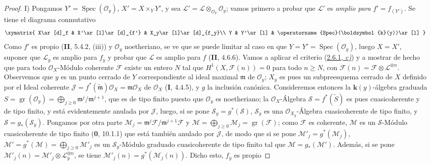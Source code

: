 \documentclass[10pt,oneside,openany]{book}
\theoremstyle{egaenv}\newtheorem*{env}{---}
\theoremstyle{egastatement}
\theoremstyle{egadescription}
\renewcommand{\geq}{\geqslant}
\begin{document}
\begin{proof}
\noindent I) Pongamos
$Y'=\operatorname{Spec}(\mathcal O_y)$, $X'=X\times_YY'$, y sea
$\mathcal L'=\mathcal L\otimes_{\mathcal O_Y}\mathcal O_y$;
vamos primero a probar que $\mathcal L'$ es \emph{amplio para}
$f'=f_{(Y')}$. Se tiene el diagrama conmutativo
\[
\xymatrix{
X\ar[d]_f & X'\ar[l]\ar[d]_{f'} & X_y\ar[l]\ar[d]_{f_y}\\
Y & Y'\ar[l] & \operatorname{Spec}(\boldsymbol{k}(y))\ar[l]
}
\]
Como $f'$ es propio (\textbf{II}, 5.4.2, (iii)) y $\mathcal O_y$ noetheriano, se
ve que se puede limitar al caso en que
$Y=Y'=\operatorname{Spec}(\mathcal O_y)$, luego $X=X'$, suponer que
$\mathcal L_y$ es amplio para $f_y$ y probar que $\mathcal L$ es amplio
para $f$ (\textbf{II}, 4.6.6). Vamos a aplicar el criterio
(\hyperref[III.2.6.1-fr]{2.6.1, \emph{c)}}) y a mostrar de hecho que para todo
$\mathcal O_X$-Módulo coherente $\mathcal F$ existe un entero $N$ tal que
$H^1(X,\mathcal F(n))=0$ para todo $n\geq N$, con
$\mathcal F(n)=\mathcal F\otimes\mathcal L^{\otimes n}$.
Observemos que $y$ es un punto cerrado de $Y$ correspondiente al ideal maximal
$\mathfrak m$ de $\mathcal O_y$; $X_y$ es pues un subpreesquema cerrado de
$X$ definido por el Ideal coherente
$\mathcal J=f^*(\widetilde{\mathfrak m})\mathcal O_X=
\mathfrak m\mathcal O_X$ de $\mathcal O_X$ (\textbf{I}, 4.4.5), y $g$ la inclusión
canónica. Consideremos entonces la $\boldsymbol{k}(y)$-álgebra graduada
$S=\operatorname{gr}(\mathcal O_y)
=\bigoplus_{j\geq0}\mathfrak m^j/\mathfrak m^{j+1}$,
que es de tipo finito puesto que $\mathcal O_y$ es noetheriano; la
$\mathcal O_X$-Álgebra $\mathcal S=f^*(\widetilde S)$ es pues
cuasicoherente y de tipo finito, y está evidentemente anulada por
$\mathcal J$, luego, si se pone $\mathcal S_y=g^*(\mathcal S)$,
$\mathcal S_y$ es una $\mathcal O_{X_y}$-Álgebra cuasicoherente de tipo
finito, y $\mathcal S=g_*(\mathcal S_y)$. Pongamos por otra parte
$\mathcal M_j=\mathfrak m^j\mathcal F/\mathfrak m^{j+1}\mathcal F$ y
$\mathcal M=\bigoplus_{j\geq0}\mathcal M_j
=\operatorname{gr}(\mathcal F)$;
como $\mathcal F$ es coherente, $\mathcal M$ es un $\mathcal S$-Módulo
cuasicoherente de tipo finito (\textbf{0}, 10.1.1) que está también anulado por
$\mathcal J$, de modo que si se pone
$\mathcal M'_j=g^*(\mathcal M_j)$, $\mathcal M'=g^*(\mathcal M)=\bigoplus_{j\geq0}\mathcal M'_j$
es un $\mathcal S_y$-Módulo graduado cuasicoherente de tipo
finito tal que $\mathcal M=g_*(\mathcal M')$. Además, si se pone
$\mathcal M'_j(n)=\mathcal M'_j\otimes\mathcal L_y^{\otimes n}$, se tiene
$\mathcal M'_j(n)=g^*(\mathcal M_j(n))$. Dicho esto, $f_y$ es propio

\end{proof}
\end{document}
